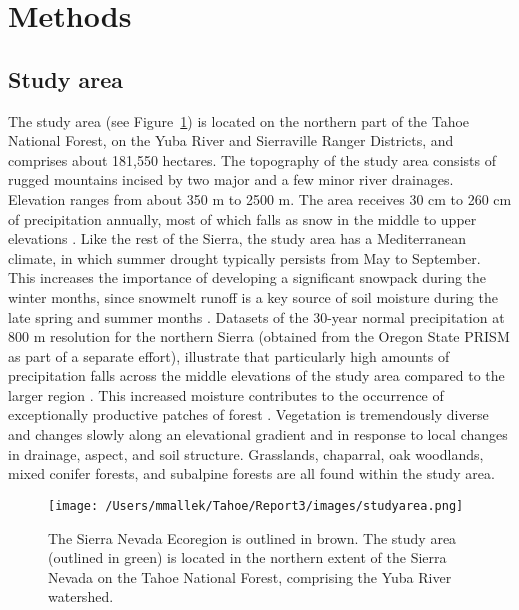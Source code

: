\section{Methods}

\subsection*{Study area}
The study area (see Figure~\ref{projectarea-ch3}) is located on the northern part of the Tahoe National Forest, on the Yuba River and Sierraville Ranger Districts, and comprises about 181,550 hectares. The topography of the study area consists of rugged mountains incised by two major and a few minor river drainages. Elevation ranges from about 350 m to 2500 m. The area receives 30 cm to 260 cm of precipitation annually, most of which falls as snow in the middle to upper elevations \citep{Storer1963}. Like the rest of the Sierra, the study area has a Mediterranean climate, in which summer drought typically persists from May to September. This increases the importance of developing a significant snowpack during the winter months, since snowmelt runoff is a key source of soil moisture during the late spring and summer months \citep{Minnich2007,Skinner1996}. Datasets of the 30-year normal precipitation at 800 m resolution for the northern Sierra (obtained from the Oregon State PRISM as part of a separate effort), illustrate that particularly high amounts of precipitation falls across the middle elevations of the study area compared to the larger region \citep{PRISMClimateGroup2004}. This increased moisture contributes to the occurrence of exceptionally productive patches of forest \citep{Littell2012}. Vegetation is tremendously diverse and changes slowly along an elevational gradient and in response to local changes in drainage, aspect, and soil structure. Grasslands, chaparral, oak woodlands, mixed conifer forests, and subalpine forests are all found within the study area.

\begin{figure}
\centering
\texttt{[image: /Users/mmallek/Tahoe/Report3/images/studyarea.png]}
\caption{The Sierra Nevada Ecoregion is outlined in brown. The study area (outlined in green) is located in the northern extent of the Sierra Nevada on the Tahoe National Forest, comprising the Yuba River watershed.}
\label{projectarea-ch3}
\end{figure}

